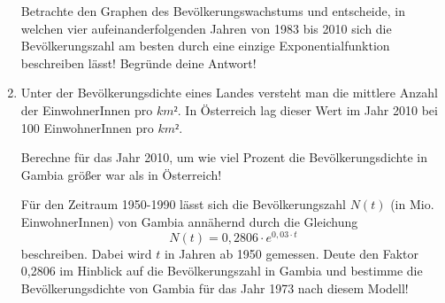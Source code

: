 \begin{langesbeispiel}
\begin{enumerate}
 Betrachte den Graphen des Bevölkerungswachstums und entscheide, in welchen vier aufeinanderfolgenden Jahren von 1983 bis 2010 sich die Bevölkerungszahl am besten durch eine einzige Exponentialfunktion beschreiben lässt! Begründe deine Antwort!

\item Unter der Bevölkerungsdichte eines Landes versteht man die mittlere Anzahl der EinwohnerInnen pro $km²$. In Österreich lag dieser Wert im Jahr 2010 bei 100 EinwohnerInnen pro $km²$.

 Berechne für das Jahr 2010, um wie viel Prozent die Bevölkerungsdichte in Gambia  größer war als in Österreich!

Für den Zeitraum 1950-1990 lässt sich die Bevölkerungszahl $N(t)$ (in Mio. EinwohnerInnen) von Gambia annähernd durch die Gleichung 
$$N(t)= 0,2806\cdot e^{0,03\cdot t}$$
 beschreiben. Dabei wird $t$ in Jahren ab 1950 gemessen. Deute den Faktor 0,2806 im Hinblick auf die Bevölkerungszahl in Gambia und bestimme die Bevölkerungsdichte von Gambia für das Jahr 1973 nach diesem Modell!
						\end{enumerate}\leer
				
\end{langesbeispiel}
